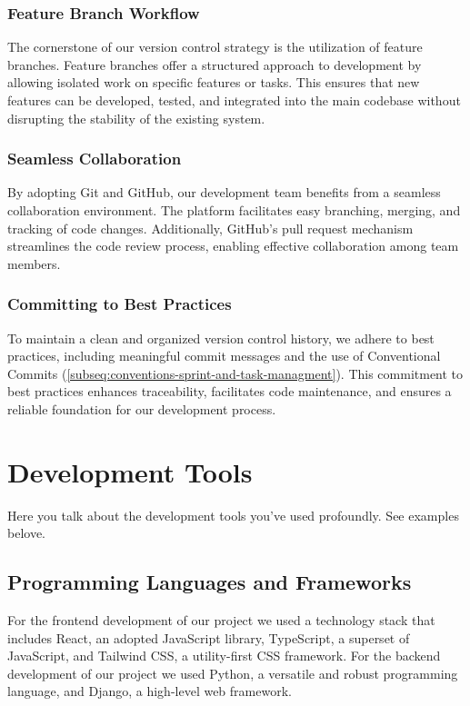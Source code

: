 \documentclass[12pt,a4paper]{article}
\begin{document}
\begin{spacing}{1.5}
    \subsubsection{Feature Branch Workflow}
    The cornerstone of our version control strategy is the utilization of feature
    branches. Feature branches offer a structured approach to development by
    allowing isolated work on specific features or tasks. This ensures that new
    features can be developed, tested, and integrated into the main codebase
    without disrupting the stability of the existing system.

    \subsubsection{Seamless Collaboration}
    By adopting Git and GitHub, our development team benefits from a seamless
    collaboration environment. The platform facilitates easy branching, merging,
    and tracking of code changes. Additionally, GitHub's pull request mechanism
    streamlines the code review process, enabling effective collaboration among
    team members.

    \subsubsection{Committing to Best Practices}
    To maintain a clean and organized version control history, we adhere to best
    practices, including meaningful commit messages and the use of Conventional
    Commits (\autoref{subseq:conventions-sprint-and-task-managment}). This
    commitment to best practices enhances traceability, facilitates code
    maintenance, and ensures a reliable foundation for our development process.

    \section{Development Tools}

    Here you talk about the development tools you've used profoundly. See examples
    belove.

    \subsection{Programming Languages and Frameworks}
    For the frontend development of our project we used a technology stack that
    includes React, an adopted JavaScript library, TypeScript, a superset of
    JavaScript, and Tailwind CSS, a utility-first CSS framework. For the backend
    development of our project we used Python, a versatile and robust programming
    language, and Django, a high-level web framework.

\end{spacing}
\end{document}

